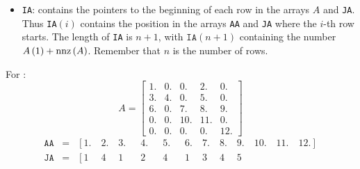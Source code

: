 \begin{itemize}
\begin{itemize}
		\item \texttt{IA}: contains the pointers to the beginning of each row in the arrays $A$ and \texttt{JA}. Thus \texttt{IA}$\left(i\right)$ contains the position in the arrays \texttt{AA} and \texttt{JA} where the $i$-th row starts. The length of \texttt{IA} is $n+1$, with $\texttt{IA}\left(n+1\right)$ containing the number $A\left(1\right) + \mathrm{nnz}\left(A\right)$. Remember that $n$ is the number of rows.
	\end{itemize}
	For :
	\begin{equation*}
		A = \begin{bmatrix}
			1. & 0. & 0.& 2. & 0. \\
			3. & 4. & 0.& 5. & 0. \\
			6. & 0. & 7.& 8. & 9. \\
			0. & 0. & 10.& 11. & 0. \\
			0. & 0. & 0.& 0. & 12. 
		\end{bmatrix}
	\end{equation*}
	\begin{equation*}
		\begin{array}{rcl}
			\texttt{AA} &=& \left[
				1.\hspace{1em}
				2.\hspace{1em}
				3.\hspace{1em}
				\phantom{1}4.\hspace{1em}
				\phantom{1}5.\hspace{1em}
				\phantom{1}6.\hspace{1em}
				7.\hspace{1em}
				8.\hspace{1em}
				9.\hspace{1em}
				10.\hspace{1em}
				11.\hspace{1em}
				12.
			\right] \\ [.5em]
			\texttt{JA} &=& \left[
				1\phantom{.}\hspace{1em}
				4\phantom{.}\hspace{1em}
				1\phantom{.}\hspace{1em}
				\phantom{1}2\phantom{.}\hspace{1em}
				\phantom{1}4\phantom{.}\hspace{1em}
				\phantom{1}1\phantom{.}\hspace{1em}
				3\phantom{.}\hspace{1em}
				4\phantom{.}\hspace{1em}
				5\phantom{.}\hspace{1em}

\end{array}
\end{equation*}
\end{itemize}
